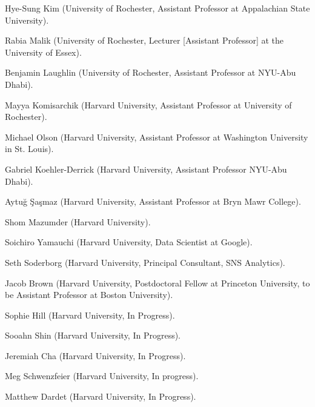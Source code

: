\documentclass[11pt,article,oneside]{memoir}
\begin{document}
\begin{cvlist}
  \begin{cvlist}
\item Hye-Sung Kim (University of Rochester, Assistant Professor at Appalachian State University).
\item Rabia Malik (University of Rochester, Lecturer [Assistant Professor] at the University of Essex).
\item Benjamin Laughlin (University of Rochester, Assistant Professor at NYU-Abu Dhabi).
\item Mayya Komisarchik (Harvard University, Assistant Professor at University of Rochester).
\item Michael Olson (Harvard University, Assistant Professor at Washington University in St. Louis).
\item Gabriel Koehler-Derrick (Harvard University, Assistant Professor NYU-Abu Dhabi).
\item Aytu\u{g} \c{S}a\c{s}maz (Harvard University, Assistant Professor at Bryn Mawr College).
\item Shom Mazumder (Harvard University).
\item Soichiro Yamauchi (Harvard University, Data Scientist at Google).
\item Seth Soderborg (Harvard University, Principal Consultant, SNS Analytics).
\item Jacob Brown (Harvard University, Postdoctoral Fellow at Princeton University, to be Assistant Professor at Boston University).
\item Sophie Hill (Harvard University, In Progress).
\item Sooahn Shin (Harvard University, In Progress).
\item Jeremiah Cha (Harvard University, In Progress).
\item Meg Schwenzfeier (Harvard University, In progress).
\item Matthew Dardet (Harvard University, In Progress).
\end{cvlist} 


\end{cvlist}
\end{document}
